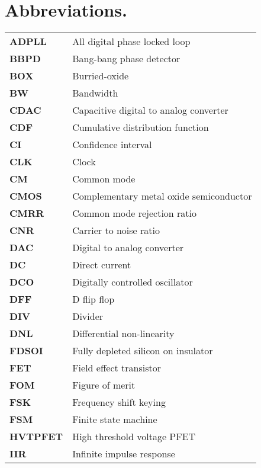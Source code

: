 \section*{Abbreviations.}
	\begin{table}[htb!]
	\renewcommand*{\arraystretch}{1.30}\large
	\begin{tabular}{@{}ll}
		\textbf{\textsf{ADPLL}}	&	All digital phase locked loop \\
		\textbf{\textsf{BBPD}}	&	Bang-bang phase detector \\
		\textbf{\textsf{BOX}}	&	Burried-oxide \\
		\textbf{\textsf{BW}}	&	Bandwidth \\
		\textbf{\textsf{CDAC}}	&	Capacitive digital to analog converter \\
		\textbf{\textsf{CDF}}	&	Cumulative distribution function \\
		\textbf{\textsf{CI}}	&	Confidence interval \\
		\textbf{\textsf{CLK}}	&	Clock \\
		\textbf{\textsf{CM}}	&	Common mode \\
		\textbf{\textsf{CMOS}}	&	Complementary metal oxide semiconductor \\
		\textbf{\textsf{CMRR}}	&	Common mode rejection ratio \\
		\textbf{\textsf{CNR}}	&	Carrier to noise ratio \\
		\textbf{\textsf{DAC}}	&	Digital to analog converter \\
		\textbf{\textsf{DC}}	&	Direct current \\
		\textbf{\textsf{DCO}}	&	Digitally controlled oscillator \\
		\textbf{\textsf{DFF}}	&	D flip flop \\
		\textbf{\textsf{DIV}}	&	Divider \\
		\textbf{\textsf{DNL}}	&	Differential non-linearity \\
		\textbf{\textsf{FDSOI}}	&	Fully depleted silicon on insulator \\
		\textbf{\textsf{FET}}	&	Field effect transistor \\
		\textbf{\textsf{FOM}}	&	Figure of merit \\
		\textbf{\textsf{FSK}}	&	Frequency shift keying \\
		\textbf{\textsf{FSM}}	&	Finite state machine \\
		\textbf{\textsf{HVTPFET}}	&	High threshold voltage PFET \\
		\textbf{\textsf{IIR}}	&	Infinite impulse response \\

\end{tabular}
\end{table}
